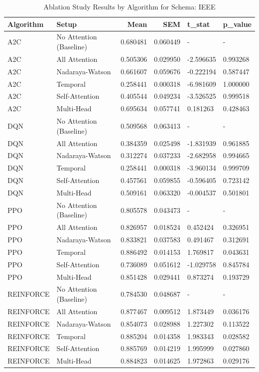 \documentclass{article}
\begin{document}
\begin{table}[ht]
\centering
\caption{Ablation Study Results by Algorithm for Schema: IEEE}
\begin{tabular}{llrrll}
\toprule
Algorithm & Setup & Mean & SEM & t\_stat & p\_value \\
\midrule
A2C & No Attention (Baseline) & 0.680481 & 0.060449 & - & - \\
A2C & All Attention & 0.505306 & 0.029950 & -2.596635 & 0.993268 \\
A2C & Nadaraya-Watson & 0.661607 & 0.059676 & -0.222194 & 0.587447 \\
A2C & Temporal & 0.258441 & 0.000318 & -6.981609 & 1.000000 \\
A2C & Self-Attention & 0.405544 & 0.049234 & -3.526525 & 0.999518 \\
A2C & Multi-Head & 0.695634 & 0.057741 & 0.181263 & 0.428463 \\
DQN & No Attention (Baseline) & 0.509568 & 0.063413 & - & - \\
DQN & All Attention & 0.384359 & 0.025498 & -1.831939 & 0.961885 \\
DQN & Nadaraya-Watson & 0.312274 & 0.037233 & -2.682958 & 0.994665 \\
DQN & Temporal & 0.258441 & 0.000318 & -3.960134 & 0.999709 \\
DQN & Self-Attention & 0.457561 & 0.059855 & -0.596405 & 0.723142 \\
DQN & Multi-Head & 0.509161 & 0.063320 & -0.004537 & 0.501801 \\
PPO & No Attention (Baseline) & 0.805578 & 0.043473 & - & - \\
PPO & All Attention & 0.826957 & 0.018524 & 0.452424 & 0.326951 \\
PPO & Nadaraya-Watson & 0.833821 & 0.037583 & 0.491467 & 0.312691 \\
PPO & Temporal & 0.886492 & 0.014153 & 1.769817 & 0.043631 \\
PPO & Self-Attention & 0.736089 & 0.051612 & -1.029758 & 0.845784 \\
PPO & Multi-Head & 0.851428 & 0.029441 & 0.873274 & 0.193729 \\
REINFORCE & No Attention (Baseline) & 0.784530 & 0.048687 & - & - \\
REINFORCE & All Attention & 0.877467 & 0.009512 & 1.873449 & 0.036176 \\
REINFORCE & Nadaraya-Watson & 0.854073 & 0.028988 & 1.227302 & 0.113522 \\
REINFORCE & Temporal & 0.885204 & 0.014358 & 1.983343 & 0.028582 \\
REINFORCE & Self-Attention & 0.885769 & 0.014219 & 1.995999 & 0.027860 \\
REINFORCE & Multi-Head & 0.884823 & 0.014625 & 1.972863 & 0.029176 \\
\bottomrule
\end{tabular}
\end{table}
\end{document}
